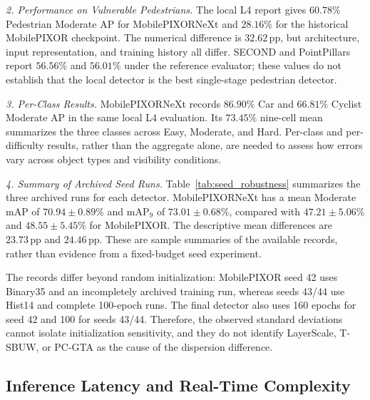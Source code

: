 \textit{2. Performance on Vulnerable Pedestrians.}
The local L4 report gives $60.78\%$ Pedestrian Moderate AP for MobilePIXORNeXt and $28.16\%$ for the historical MobilePIXOR checkpoint. The numerical difference is $32.62\,\text{pp}$, but architecture, input representation, and training history all differ. SECOND and PointPillars report $56.56\%$ and $56.01\%$ under the reference evaluator; these values do not establish that the local detector is the best single-stage pedestrian detector.

\textit{3. Per-Class Results.}
MobilePIXORNeXt records $86.90\%$ Car and $66.81\%$ Cyclist Moderate AP in the same local L4 evaluation. Its $73.45\%$ nine-cell mean summarizes the three classes across Easy, Moderate, and Hard. Per-class and per-difficulty results, rather than the aggregate alone, are needed to assess how errors vary across object types and visibility conditions.

\textit{4. Summary of Archived Seed Runs.}
Table~\ref{tab:seed_robustness} summarizes the three archived runs for each detector. MobilePIXORNeXt has a mean Moderate mAP of $70.94\pm0.89\%$ and $\text{mAP}_9$ of $73.01\pm0.68\%$, compared with $47.21\pm5.06\%$ and $48.55\pm5.45\%$ for MobilePIXOR. The descriptive mean differences are $23.73\,\text{pp}$ and $24.46\,\text{pp}$. These are sample summaries of the available records, rather than evidence from a fixed-budget seed experiment.

The records differ beyond random initialization: MobilePIXOR seed 42 uses Binary35 and an incompletely archived training run, whereas seeds 43/44 use Hist14 and complete 100-epoch runs. The final detector also uses 160 epochs for seed 42 and 100 for seeds 43/44. Therefore, the observed standard deviations cannot isolate initialization sensitivity, and they do not identify LayerScale, T-SBUW, or PC-GTA as the cause of the dispersion difference.

\subsection{Inference Latency and Real-Time Complexity}
\label{sec:latency_analysis}



